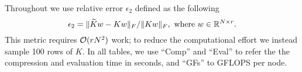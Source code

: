 

Throughout we use relative error $\epsilon_2$ defined as the following
\begin{equation}
  \epsilon_2 = \|{\widetilde{K}}w-Kw\|_F / \|Kw\|_F,\ \mbox{where} \ w \in \mathbb{R}^{N\times r}.
\end{equation}
This metric requires ${\mathcal O}(rN^2)$ work; to reduce the computational effort we instead sample 100 rows of $K$.
In all tables, we use ``\rm{Comp}'' and ``\rm{Eval}'' to refer the the 
compression and evaluation time in seconds, and ``\rm{GFs}'' to 
\rm{GFLOPS} per node.

